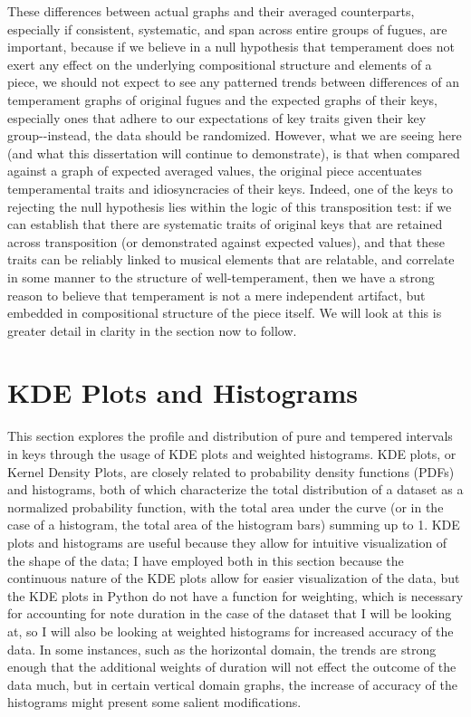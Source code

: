 These differences between actual graphs and their averaged counterparts,
especially if consistent, systematic, and span across entire groups of
fugues, are important, because if we believe in a null hypothesis that
temperament does not exert any effect on the underlying compositional
structure and elements of a piece, we should not expect to see any
patterned trends between differences of an temperament graphs of
original fugues and the expected graphs of their keys, especially ones
that adhere to our expectations of key traits given their key
group-\/-instead, the data should be randomized. However, what we are
seeing here (and what this dissertation will continue to demonstrate),
is that when compared against a graph of expected averaged values, the
original piece accentuates temperamental traits and idiosyncracies of
their keys. Indeed, one of the keys to rejecting the null hypothesis
lies within the logic of this transposition test: if we can establish
that there are systematic traits of original keys that are retained
across transposition (or demonstrated against expected values), and that
these traits can be reliably linked to musical elements that are
relatable, and correlate in some manner to the structure of
well-temperament, then we have a strong reason to believe that
temperament is not a mere independent artifact, but embedded in
compositional structure of the piece itself. We will look at this is
greater detail in clarity in the section now to follow.

    \section{KDE Plots and Histograms}\label{kde-plots-and-histograms}

This section explores the profile and distribution of pure and tempered
intervals in keys through the usage of KDE plots and weighted
histograms. KDE plots, or Kernel Density Plots, are closely related to
probability density functions (PDFs) and histograms, both of which
characterize the total distribution of a dataset as a normalized
probability function, with the total area under the curve (or in the
case of a histogram, the total area of the histogram bars) summing up to
1. KDE plots and histograms are useful because they allow for intuitive
visualization of the shape of the data; I have employed both in this
section because the continuous nature of the KDE plots allow for easier
visualization of the data, but the KDE plots in Python do not have a
function for weighting, which is necessary for accounting for note
duration in the case of the dataset that I will be looking at, so I will
also be looking at weighted histograms for increased accuracy of the
data. In some instances, such as the horizontal domain, the trends are
strong enough that the additional weights of duration will not effect
the outcome of the data much, but in certain vertical domain graphs, the
increase of accuracy of the histograms might present some salient
modifications.


